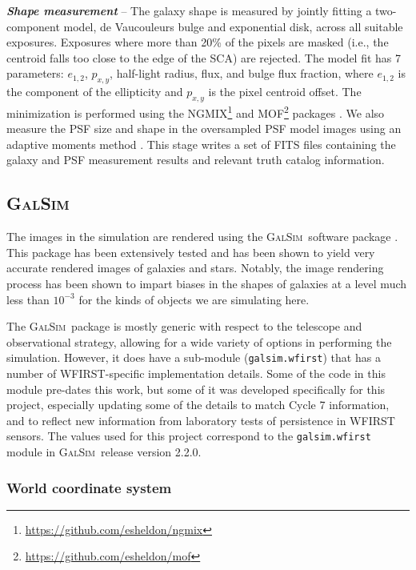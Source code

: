 \documentclass[aps,prd, amsmath,amssymb,superscriptaddress,showkeys,nofootinbib,reprint,preprintnumbers]{revtex4-1}
\newcommand{\galsim}{\textsc{GalSim}}
\begin{document}
\textbf{\textit{Shape measurement}} -- 
The galaxy shape is measured by jointly fitting a two-component model, de Vaucouleurs bulge and exponential disk, across all suitable exposures. 
Exposures where more than 20\% of the pixels are masked (i.e., the centroid falls too close to the edge of the SCA) are rejected. 
The model fit has 7 parameters: $e_{1,2}$, $p_{x,y}$, half-light radius, flux, and bulge flux fraction, where $e_{1,2}$ is the component of the ellipticity and $p_{x,y}$ is the pixel centroid offset. 
The minimization is performed using the \textsc{NGMIX}\footnote{\url{https://github.com/esheldon/ngmix}} and \textsc{MOF}\footnote{\url{https://github.com/esheldon/mof}} packages \cite{2014MNRAS.444L..25S}. 
We also measure the PSF size and shape in the oversampled PSF model images using an adaptive moments method \cite{2003MNRAS.343..459H}. 
This stage writes a set of FITS files containing the galaxy and PSF measurement results and relevant truth catalog information.

\subsection{\galsim}

The images in the simulation are rendered using the \galsim\ software package \cite{Rowe15}.  
This package has been extensively tested and has been shown to yield very accurate rendered images of galaxies and stars.
Notably, the image rendering process has been shown to impart biases in the shapes of galaxies at a level much less than $10^{-3}$ for the kinds of objects we are simulating here.  

The \galsim\ package is mostly generic with respect to the telescope and observational strategy, allowing for a wide variety of options in performing the simulation.
However, it does have a sub-module (\texttt{galsim.wfirst}) that has a number of WFIRST-specific implementation details.
Some of the code in this module pre-dates this work, but some of it was developed specifically for this project, especially updating some of the details to match Cycle 7 information, and to reflect new information from laboratory tests of persistence in WFIRST sensors.  
The values used for this project correspond to the \texttt{galsim.wfirst} module in \galsim\ release version 2.2.0.

\subsubsection{World coordinate system}\label{wcs}
\end{document}
